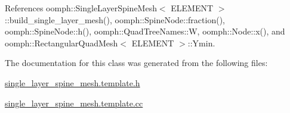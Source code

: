 References oomph\+::\+Single\+Layer\+Spine\+Mesh$<$ E\+L\+E\+M\+E\+N\+T $>$\+::build\+\_\+single\+\_\+layer\+\_\+mesh(), oomph\+::\+Spine\+Node\+::fraction(), oomph\+::\+Spine\+Node\+::h(), oomph\+::\+Quad\+Tree\+Names\+::W, oomph\+::\+Node\+::x(), and oomph\+::\+Rectangular\+Quad\+Mesh$<$ E\+L\+E\+M\+E\+N\+T $>$\+::\+Ymin.



The documentation for this class was generated from the following files\+:\begin{DoxyCompactItemize}
\item 
\hyperlink{single__layer__spine__mesh_8template_8h}{single\+\_\+layer\+\_\+spine\+\_\+mesh.\+template.\+h}\item 
\hyperlink{single__layer__spine__mesh_8template_8cc}{single\+\_\+layer\+\_\+spine\+\_\+mesh.\+template.\+cc}\end{DoxyCompactItemize}
